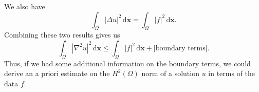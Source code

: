 We also have
\begin{equation}\label{eq:interior-regularity-formal-laplacian-data-identity}
\int_\Omega|\Delta u|^2\,\mathrm{d}\bm{x}=\int_\Omega|f|^2\,\mathrm{d}\bm{x}.
\end{equation}
Combining these two results gives us
\begin{equation}\label{eq:interior-regularity-formal-hessian-boundary-estimate}
\int_\Omega|\nabla^2u|^2\,\mathrm{d}\bm{x}\leq\int_\Omega|f|^2\,\mathrm{d}\bm{x}+|\text{boundary terms}|.
\end{equation}
Thus, if we had some additional information on the boundary terms, we could derive an a priori estimate on the $H^2(\Omega)$ norm of a solution $u$ in terms of the data $f$.
